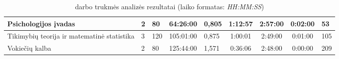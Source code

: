 \begin{sidewaystable}
\begin{tabular}{|p{10em}|p{50pt}|p{50pt}|p{5.5em}|p{4em}|c|c|c|p{5em}|}
  Psichologijos įvadas        & 2                      & 80                              & 64:26:00                 & 0,805                                                    & 1:12:57 & 2:57:00 & 0:02:00 & 53 \\
  \hline                                                                                                                                                                         
  Tikimybių teorija ir                                                                                                                                                           
  matematinė statistika       & 3                      & 120                             & 105:01:00                & 0,875                                                    & 1:00:01 & 2:49:00 & 0:01:00 & 105 \\
  \hline                                                                                                                                                                         
  Vokiečių kalba              & 2                      & 80                              & 125:44:00                & 1,571                                                    & 0:36:06 & 2:48:00 & 0:00:00 & 209 \\
  \hline
\end{tabular}
\caption{darbo trukmės analizės rezultatai (laiko formatas:
  \emph{HH:MM:SS})}
  \label{tbl:durations}
\end{sidewaystable}
